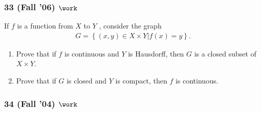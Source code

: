 \hypertarget{fall-06-work}{%
\subsubsection{\texorpdfstring{33 (Fall '06)
\(\work\)}{33 (Fall '06) \textbackslash work}}\label{fall-06-work}}

\begin{problem}[?]

If \(f\) is a function from \(X\) to \(Y\) , consider the graph
\begin{align*}
G = \left\{{(x, y) \in X \times Y \mathrel{\Big|}f (x) = y}\right\}
.\end{align*}

\begin{enumerate}
\def\labelenumi{\alph{enumi}.}
\item
  Prove that if \(f\) is continuous and \(Y\) is Hausdorff, then \(G\)
  is a closed subset of \(X \times Y\).
\item
  Prove that if \(G\) is closed and \(Y\) is compact, then \(f\) is
  continuous.
\end{enumerate}

\end{problem}

\hypertarget{fall-04-work}{%
\subsubsection{\texorpdfstring{34 (Fall '04)
\(\work\)}{34 (Fall '04) \textbackslash work}}\label{fall-04-work}}

